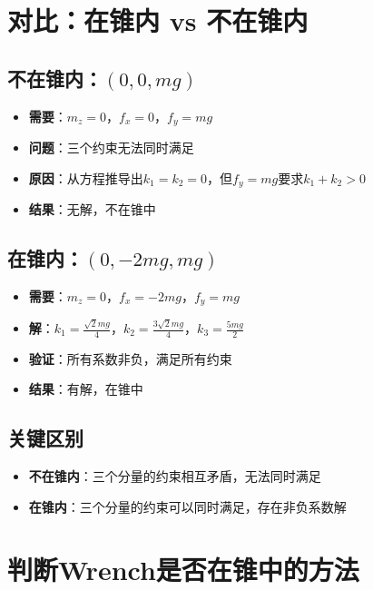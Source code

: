 \documentclass[12pt,a4paper]{article}
\begin{document}
\section{对比：在锥内 vs 不在锥内}

\subsection{不在锥内：$(0, 0, mg)$}

\begin{itemize}
    \item \textbf{需要}：$m_z = 0$，$f_x = 0$，$f_y = mg$
    \item \textbf{问题}：三个约束无法同时满足
    \item \textbf{原因}：从方程推导出$k_1 = k_2 = 0$，但$f_y = mg$要求$k_1 + k_2 > 0$
    \item \textbf{结果}：无解，不在锥中
\end{itemize}

\subsection{在锥内：$(0, -2mg, mg)$}

\begin{itemize}
    \item \textbf{需要}：$m_z = 0$，$f_x = -2mg$，$f_y = mg$
    \item \textbf{解}：$k_1 = \frac{\sqrt{2}mg}{4}$，$k_2 = \frac{3\sqrt{2}mg}{4}$，$k_3 = \frac{5mg}{2}$
    \item \textbf{验证}：所有系数非负，满足所有约束
    \item \textbf{结果}：有解，在锥中
\end{itemize}

\subsection{关键区别}

\begin{itemize}
    \item \textbf{不在锥内}：三个分量的约束相互矛盾，无法同时满足
    \item \textbf{在锥内}：三个分量的约束可以同时满足，存在非负系数解
\end{itemize}

\section{判断Wrench是否在锥中的方法}
\end{document}
